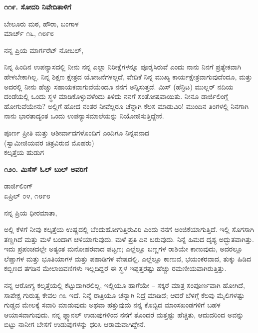\begin{center}
\textbf{೧೧೯. ಸೋದರಿ ನಿವೇದಿತಾಳಿಗೆ}
\end{center}

\begin{flushright}
ಬೇಲೂರು ಮಠ, ಹೌರಾ, ಬಂಗಾಳ\\ಮಾರ್ಚ್ ೧೬, ೧೮೯೮
\end{flushright}

ನನ್ನ ಪ್ರಿಯ ಮಾರ್ಗರೆಟ್ ನೋಬಲ್,

ನಿನ್ನ ಹಿಂದಿನ ಉಪನ್ಯಾಸದಲ್ಲಿ ನೀನು ನನ್ನ ಎಲ್ಲಾ ನಿರೀಕ್ಷೆಗಳನ್ನೂ ಪೂರೈಸಿರುವೆ ಎಂದು ನಾನು ನಿನಗೆ ಪ್ರತ್ಯೇಕವಾಗಿ ಹೇಳಬೇಕಾಗಿಲ್ಲ. ನಿನ್ನ ಶಿಕ್ಷಣ ಕ್ಷೇತ್ರದ ಯೋಜನೆಗಳಲ್ಲದೆ, ವೇದಿಕೆ ನಿನ್ನ ಮುಖ್ಯ ಕಾರ್ಯಕ್ಷೇತ್ರವಾಗುವುದೆಂದೂ, ಮತ್ತು ಅದರಲ್ಲಿ ನೀನು ಹೆಚ್ಚು ಸಹಾಯಕವಾಗುವೆಯೆಂದೂ ನನಗೆ ಅನ್ನಿಸುತ್ತದೆ. ಮಿಸ್ (ಹೆನ್ರಿಟ) ಮುಲ್ಲರ್ ನದಿಯ ದಂಡೆಯಲ್ಲಿ ಒಂದು ಸ್ಥಳ ಮಾಡಿಕೊಳ್ಳುವಳೆಂದು ತಿಳಿದು ನನಗೆ ಸಂತೋಷವಾಯಿತು. ನೀನೂ ಡಾರ್ಜಿಲಿಂಗ್ಗೆ ಹೋಗುವೆಯೇನು? ಅಲ್ಲಿಗೆ ಹೋದ ನಂತರ ನೀವೆಲ್ಲರೂ ಚೆನ್ನಾಗಿ ಕೆಲಸ ಮಾಡುವಿರಿ! ಮುಂದಿನ ತಿಂಗಳಲ್ಲಿ ನಿನಗಾಗಿ ನಾನು ಭಾರತಾದ್ಯಂತ ಒಂದು ಉಪನ್ಯಾಸಮಾಲೆಯನ್ನು ನಿಯೋಜಿಸುತ್ತಿದ್ದೇನೆ.

\begin{flushright}
ಪೂರ್ಣ ಪ್ರೀತಿ ಮತ್ತು ಆಶೀರ್ವಾದಗಳೊಂದಿಗೆ ಎಂದಿಗೂ ನಿನ್ನವನಾದ\\(ಸ್ವಾಮೀಜಿಯವರ ಚಿತ್ರವಿರುವ ಮೊಹರು)\\ಕಲ್ಕತ್ತೆಯ ಹುಡುಗ
\end{flushright}

\begin{center}
\textbf{೧೨೦. ಮಿಸೆಸ್ ಓಲ್ ಬುಲ್ ಅವರಿಗೆ}
\end{center}

\begin{flushright}
ಡಾರ್ಜಿಲಿಂಗ್\\ಏಪ್ರಿಲ್ ೦೪, ೧೮೯೮
\end{flushright}

ನನ್ನ ಪ್ರಿಯ ಧೀರಮಾತಾ,

ಅಲ್ಲಿ ಕೆಳಗೆ ನೀವು ಕಲ್ಕತ್ತೆಯ ಉಷ್ಣದಲ್ಲಿ ಬೆಂದುಹೋಗುತ್ತಿರುವಿರಿ ಎಂದು ನನಗೆ ಅಂಜಿಕೆಯಾಗುತ್ತಿದೆ. ಇಲ್ಲಿ ಸೊಗಸಾಗಿ ತಣ್ಣಗಿದೆ ಮತ್ತು ಮಳೆ ಬಂದಾಗ ಚಳಿಯಾಗುವುದು. ಮಳೆ ಪ್ರತಿ ದಿನ ಬರುವುದು. ನಿನ್ನೆ ಹಿಮದ ದೃಶ್ಯ ಅದ್ಭುತವಾಗಿತ್ತು. ಇದು ಪ್ರಪಂಚದಲ್ಲೇ ಅತ್ಯಂತ ಮನೋಹರವಾದ ಪಟ್ಟಣ; ಎಲ್ಲೆಲ್ಲೂ ಬಣ್ಣಗಳ ರಾಶಿಯೇ ಕಾಣುವುದು, ಅದರಲ್ಲೂ ಲೆಪ್ಚಾಗಳ ಮತ್ತು ಭೂತಿಯಾಗಳ ಮತ್ತು ಪಹಾಡಿಗಳ ವೇಷದಲ್ಲಿ. ಎಲ್ಲೆಲ್ಲೂ ಕಾಣುವ, ಭಯಂಕರವಾದ, ತುಕ್ಕು ಹಿಡಿದ ಕಬ್ಬಿಣದ ತಗಡಿನ ಮೇಲಾಙವಣಿಗಳು ಇಲ್ಲದಿದ್ದರೆ ಈ ಸ್ಥಳ ಇಪ್ಪತ್ತರಷ್ಟು ಹೆಚ್ಚು ರಮಣೀಯವಾಗಿರುತ್ತಿತ್ತು.

ನನ್ನ ಆರೋಗ್ಯ ಕಲ್ಕತ್ತೆಯಲ್ಲಿ ಕೆಟ್ಟುದಾಗಿರಲಿಲ್ಲ, ಇಲ್ಲಿಯೂ ಹಾಗೆಯೇ – ಸಕ್ಕರೆ ಮಾತ್ರ ಸಂಪೂರ್ಣವಾಗಿ ಹೋಗಿದೆ, ಸಾಪೇಕ್ಷ ಗುರುತ್ವ ಕೇವಲ ೧೩ ಇದೆ. ನಿನ್ನೆ ರಾತ್ರಿಯೂ ಚೆನ್ನಾಗಿ ನಿದ್ರೆ ಮಾಡಿದೆ; ಆದರೆ ಬೆಳಗ್ಗೆ ಕೆಲವು ಮೈಲಿಗಳಷ್ಟು ಗುಡ್ಡದ ಮೇಲಕ್ಕೆ ಸವಾರಿ ಮಾಡುವುದು ಅಥವಾ ಹತ್ತುವುದು ನನ್ನ ಕೊಬ್ಬಿದ ಮಾಂಸಖಂಡಗಳಿಗೆ ಬಹಳ ಆಯಾಸವಾಗುವುದು. ನನ್ನ ಫ್ಲ್ಯಾನಲ್ ಉಡುಪುಗಳಿಂದ ನನಗೆ ತೊಂದರೆ ಮತ್ತಷ್ಟು ಹೆಚ್ಚಿತು, ಆದುದರಿಂದ ಅವನ್ನು ಬಿಟ್ಟು ನಾನೀಗ ಬೇಸಗೆ ಉಡುಪುಗಳನ್ನು ಧರಿಸಿ ಆರಾಮವಾಗಿದ್ದೇನೆ.

